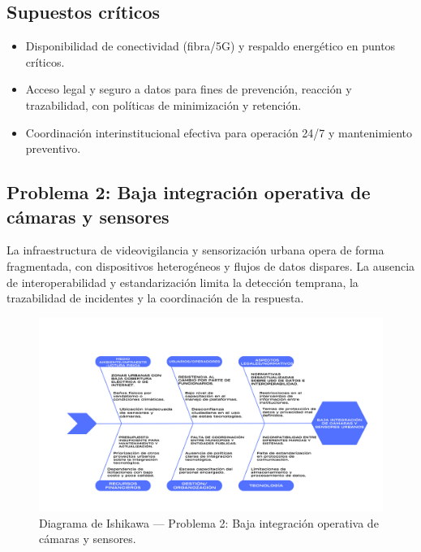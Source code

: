 \documentclass[12pt,a4paper]{article}
\begin{document}
\subsection*{Supuestos críticos}
\begin{itemize}
    \item Disponibilidad de conectividad (fibra/5G) y respaldo energético en puntos críticos.
    \item Acceso legal y seguro a datos para fines de prevención, reacción y trazabilidad, con políticas de minimización y retención.
    \item Coordinación interinstitucional efectiva para operación 24/7 y mantenimiento preventivo.
\end{itemize}


\subsection*{Problema 2: Baja integración operativa de cámaras y sensores}

\noindent La infraestructura de videovigilancia y sensorización urbana opera de forma fragmentada, con dispositivos heterogéneos y flujos de datos dispares. La ausencia de interoperabilidad y estandarización limita la detección temprana, la trazabilidad de incidentes y la coordinación de la respuesta.

\begin{figure}[htbp]
  \centering
  \includegraphics[width=\linewidth]{ishikawa_p2.png} %
  \caption{Diagrama de Ishikawa — Problema 2: Baja integración operativa de cámaras y sensores.}
  \label{fig:ishikawa-p2}
\end{figure}
\end{document}
